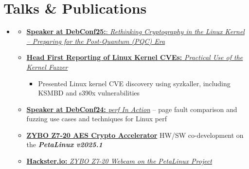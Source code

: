 \documentclass[letterpaper,11pt]{article}
\newcommand{\cvitem}[1]{
  \item\small{
    {#1\vspace{-2pt}}
  }
}
\newcommand{\cvheadingstart}{\begin{itemize}[leftmargin=0in, label={}]}
\newcommand{\cvheadingend}{\end{itemize}}
\newcommand{\cvitemstart}{\begin{itemize}[label=\textopenbullet]\justifying}
\newcommand{\cvitemend}{\end{itemize}\vspace{-5pt}}
\begin{document}
\section{Talks \& Publications}
\cvheadingstart
\item
\cvitemstart

\cvitem{\href{https://youtu.be/__DURK3p218?si=aPn0f2Kixq3V4P7T}{{\textbf{Speaker at DebConf25:}: \textit{Rethinking Cryptography in the Linux Kernel – Preparing for the Post-Quantum (PQC) Era}}} }
 \cvitem{
  \href{https://youtu.be/nGxzzORZm1o?si=1k9Mz54uqYNatnO1}{\textbf{Head First Reporting of Linux Kernel CVEs:} \textit{Practical Use of the Kernel Fuzzer}}}
\begin{itemize}
  \item Presented Linux kernel CVE discovery using syzkaller, including KSMBD and s390x vulnerabilities
\end{itemize}

  \cvitem{\href{https://youtu.be/RRJN8JS5xAE?si=_X-7-OyXzPrcyGes}{{\textbf{Speaker at DebConf24:}} \textit{perf In Action}} – page fault  comparison and fuzzing use cases and techniques for Linux perf}

  \cvitem{ \textbf{\href{https://www.linkedin.com/posts/yunseong-kim-linux-kernel_xilinx-fpga-linux-activity-7341153544160362496-_sBg?utm_source=share&utm_medium=member_desktop&rcm=ACoAADZ7vgEBrd70u0-SnyUUHL-swTgyhcvNQGE}{ZYBO Z7-20 AES Crypto Accelerator}} HW/SW co-development on the \textit{\textbf{PetaLinux v2025.1}}}

  \cvitem{\href{https://www.hackster.io/p4ranlee/zybo-z7-20-webcam-on-the-petalinux-c28709}{{\textbf{Hackster.io:}} \textit{ZYBO Z7-20 Webcam on the PetaLinux Project}} }
  
\cvitemend
\cvheadingend
\end{document}

